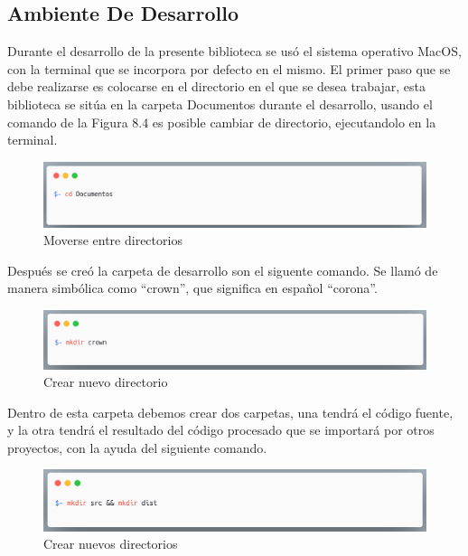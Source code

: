     \subsection{Ambiente De Desarrollo}
    Durante el desarrollo de la presente biblioteca se usó el sistema operativo MacOS, con la terminal que se incorpora por defecto en el mismo.
    El primer paso que se debe realizarse es colocarse en el directorio en el que se desea trabajar, esta biblioteca se sitúa en la carpeta Documentos durante el desarrollo, usando el comando de la Figura 8.4 es posible cambiar de directorio, ejecutandolo en la terminal.
    
    \newline
     \begin{figure}[H]
     \includegraphics[width=1\textwidth]{./Imagenes/image15.png}
     \caption[Moverse entre directorios]{Moverse entre directorios}
         \end{figure}
Después se creó la carpeta de desarrollo son el siguente comando. Se llamó de manera simbólica como “crown”, que significa en español “corona”.
     \begin{figure}[H]
    \includegraphics[width=1\textwidth]{./Imagenes/image7.png}
     \caption[Crear nuevo directorio]{Crear nuevo directorio}
         \end{figure}
    
    Dentro de esta carpeta debemos crear dos carpetas, una tendrá el código fuente, y la otra tendrá el resultado del código procesado que se importará por otros proyectos, con la ayuda del siguiente comando.
    \newline
     \begin{figure}[hbt!]
    \includegraphics[width=1\textwidth]{./Imagenes/image37.png}
     \caption[Crear nuevos directorios]{Crear nuevos directorios}
         \end{figure}
    \newline
    \newline
    
